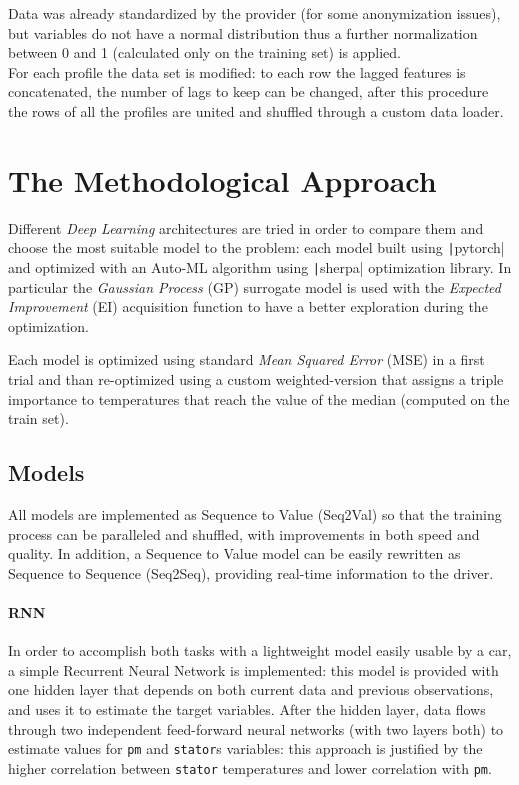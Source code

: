 Data was already standardized by the provider (for some anonymization issues), but variables do not have a normal distribution thus a further normalization between 0 and 1 (calculated only on the training set) is applied.\\
For each profile the data set is modified: to each row the lagged features is concatenated, the number of lags to keep can be changed, after this procedure the rows of all the profiles are united and shuffled through a custom data loader.

\section{The Methodological Approach}
Different \textit{Deep Learning} architectures are tried in order to compare them and choose the most suitable model to the problem: each model built using \texttt|pytorch| and optimized with an Auto-ML algorithm using \texttt|sherpa| optimization library.
In particular the \textit{Gaussian Process} (GP) surrogate model is used with the \textit{Expected Improvement} (EI) acquisition function to have a better exploration during the optimization.

Each model is optimized using standard \textit{Mean Squared Error} (MSE) in a first trial and than re-optimized using a custom weighted-version that assigns a triple importance to temperatures that reach the value of the median (computed on the train set).

\subsection{Models}
All models are implemented as Sequence to Value (Seq2Val) so that the training process can be paralleled and shuffled, with improvements in both speed and quality.
In addition, a Sequence to Value model can be easily rewritten as Sequence to Sequence (Seq2Seq), providing real-time information to the driver.

\paragraph{RNN}
In order to accomplish both tasks with a lightweight model easily usable by a car, a simple Recurrent Neural Network is implemented: this model is provided with one hidden layer that depends on both current data and previous observations, and uses it to estimate the target variables.
After the hidden layer, data flows through two independent feed-forward neural networks (with two layers both) to estimate values for \verb|pm| and \verb|stator|s variables: this approach is justified by the higher correlation between \verb|stator| temperatures and lower correlation with \verb|pm|.

